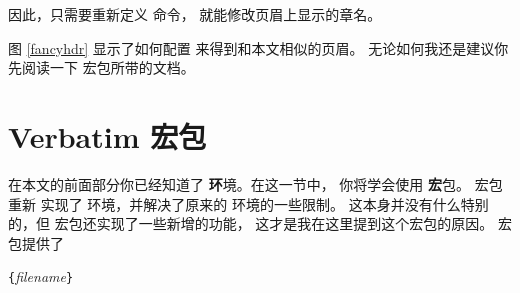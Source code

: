 
因此，只需要重新定义  命令，
就能修改页眉上显示的章名。


图 \ref{fancyhdr} 显示了如何配置  来得到和本文相似的页眉。
无论如何我还是建议你先阅读一下  宏包所带的文档。

\section{Verbatim 宏包}


在本文的前面部分你已经知道了  {\textbf
环境}。在这一节中， 你将学会使用  {\textbf
宏包}。  宏包重新
实现了  环境，并解决了原来的  环境的一些限制。
这本身并没有什么特别的，但  宏包还实现了一些新增的功能，
这才是我在这里提到这个宏包的原因。  宏包提供了

\begin{lscommand}
\verb|{|\emph{filename}\verb|}|
\end{lscommand}


